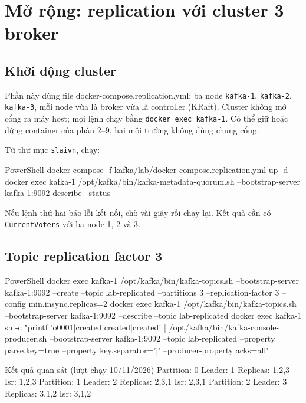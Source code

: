 \section{Mở rộng: replication với cluster 3 broker}

\subsection{Khởi động cluster}

Phần này dùng file docker-compose.replication.yml: ba node \texttt{kafka-\allowbreak{}1}, \texttt{kafka-\allowbreak{}2}, \texttt{kafka-\allowbreak{}3}, mỗi node vừa là broker vừa là controller (KRaft). Cluster không mở cổng ra máy host; mọi lệnh chạy bằng \texttt{docker exec kafka-\allowbreak{}1}. Có thể giữ hoặc dừng container của phần 2--9, hai môi trường không dùng chung cổng.


Từ thư mục \texttt{slaivn}, chạy:


\begin{aivncodebox}[language={}]{PowerShell}
docker compose -f kafka/lab/docker-compose.replication.yml up -d
docker exec kafka-1 /opt/kafka/bin/kafka-metadata-quorum.sh --bootstrap-server kafka-1:9092 describe --status
\end{aivncodebox}

Nếu lệnh thứ hai báo lỗi kết nối, chờ vài giây rồi chạy lại. Kết quả cần có \texttt{CurrentVoters} với ba node 1, 2 và 3.


\subsection{Topic replication factor 3}

\begin{aivncodebox}[language={}]{PowerShell}
docker exec kafka-1 /opt/kafka/bin/kafka-topics.sh --bootstrap-server kafka-1:9092 --create --topic lab-replicated --partitions 3 --replication-factor 3 --config min.insync.replicas=2
docker exec kafka-1 /opt/kafka/bin/kafka-topics.sh --bootstrap-server kafka-1:9092 --describe --topic lab-replicated
docker exec kafka-1 sh -c "printf 'o0001|created|created|created\n' | /opt/kafka/bin/kafka-console-producer.sh --bootstrap-server kafka-1:9092 --topic lab-replicated --property parse.key=true --property key.separator='|' --producer-property acks=all"
\end{aivncodebox}

\begin{aivnCodeOutput}{Kết quả quan sát (lượt chạy 10/11/2026)}
Partition: 0  Leader: 1  Replicas: 1,2,3  Isr: 1,2,3
Partition: 1  Leader: 2  Replicas: 2,3,1  Isr: 2,3,1
Partition: 2  Leader: 3  Replicas: 3,1,2  Isr: 3,1,2
\end{aivnCodeOutput}

